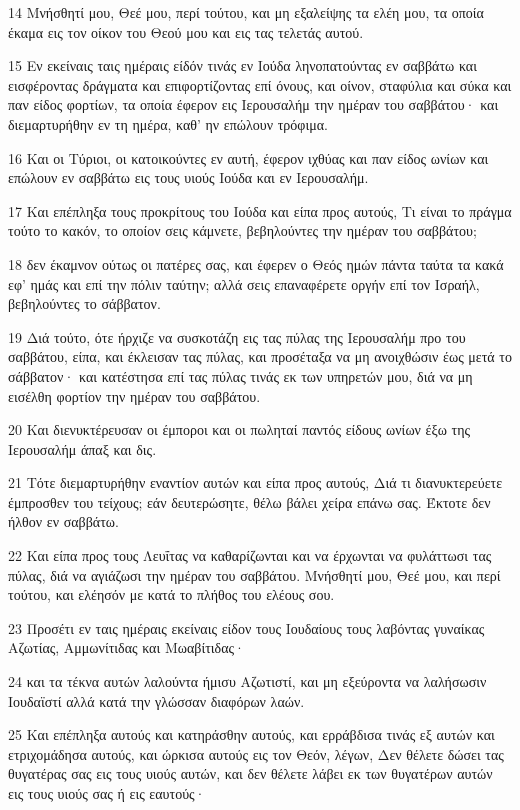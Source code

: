 \par 14 Μνήσθητί μου, Θεέ μου, περί τούτου, και μη εξαλείψης τα ελέη μου, τα οποία έκαμα εις τον οίκον του Θεού μου και εις τας τελετάς αυτού.
\par 15 Εν εκείναις ταις ημέραις είδόν τινάς εν Ιούδα ληνοπατούντας εν σαββάτω και εισφέροντας δράγματα και επιφορτίζοντας επί όνους, και οίνον, σταφύλια και σύκα και παν είδος φορτίων, τα οποία έφερον εις Ιερουσαλήμ την ημέραν του σαββάτου· και διεμαρτυρήθην εν τη ημέρα, καθ' ην επώλουν τρόφιμα.
\par 16 Και οι Τύριοι, οι κατοικούντες εν αυτή, έφερον ιχθύας και παν είδος ωνίων και επώλουν εν σαββάτω εις τους υιούς Ιούδα και εν Ιερουσαλήμ.
\par 17 Και επέπληξα τους προκρίτους του Ιούδα και είπα προς αυτούς, Τι είναι το πράγμα τούτο το κακόν, το οποίον σεις κάμνετε, βεβηλούντες την ημέραν του σαββάτου;
\par 18 δεν έκαμνον ούτως οι πατέρες σας, και έφερεν ο Θεός ημών πάντα ταύτα τα κακά εφ' ημάς και επί την πόλιν ταύτην; αλλά σεις επαναφέρετε οργήν επί τον Ισραήλ, βεβηλούντες το σάββατον.
\par 19 Διά τούτο, ότε ήρχιζε να συσκοτάζη εις τας πύλας της Ιερουσαλήμ προ του σαββάτου, είπα, και έκλεισαν τας πύλας, και προσέταξα να μη ανοιχθώσιν έως μετά το σάββατον· και κατέστησα επί τας πύλας τινάς εκ των υπηρετών μου, διά να μη εισέλθη φορτίον την ημέραν του σαββάτου.
\par 20 Και διενυκτέρευσαν οι έμποροι και οι πωληταί παντός είδους ωνίων έξω της Ιερουσαλήμ άπαξ και δις.
\par 21 Τότε διεμαρτυρήθην εναντίον αυτών και είπα προς αυτούς, Διά τι διανυκτερεύετε έμπροσθεν του τείχους; εάν δευτερώσητε, θέλω βάλει χείρα επάνω σας. Έκτοτε δεν ήλθον εν σαββάτω.
\par 22 Και είπα προς τους Λευΐτας να καθαρίζωνται και να έρχωνται να φυλάττωσι τας πύλας, διά να αγιάζωσι την ημέραν του σαββάτου. Μνήσθητί μου, Θεέ μου, και περί τούτου, και ελέησόν με κατά το πλήθος του ελέους σου.
\par 23 Προσέτι εν ταις ημέραις εκείναις είδον τους Ιουδαίους τους λαβόντας γυναίκας Αζωτίας, Αμμωνίτιδας και Μωαβίτιδας·
\par 24 και τα τέκνα αυτών λαλούντα ήμισυ Αζωτιστί, και μη εξεύροντα να λαλήσωσιν Ιουδαϊστί αλλά κατά την γλώσσαν διαφόρων λαών.
\par 25 Και επέπληξα αυτούς και κατηράσθην αυτούς, και ερράβδισα τινάς εξ αυτών και ετριχομάδησα αυτούς, και ώρκισα αυτούς εις τον Θεόν, λέγων, Δεν θέλετε δώσει τας θυγατέρας σας εις τους υιούς αυτών, και δεν θέλετε λάβει εκ των θυγατέρων αυτών εις τους υιούς σας ή εις εαυτούς·
